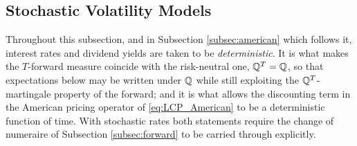 



\subsection{Stochastic Volatility Models}\label{subsec:stochvol}

Throughout this subsection, and in Subsection \ref{subsec:american} which follows it, interest rates and dividend yields are taken to be \emph{deterministic}. It is what makes the $T$-forward measure coincide with the risk-neutral one, $\mathbb{Q}^{T} = \mathbb{Q}$, so that expectations below may be written under $\mathbb{Q}$ while still exploiting the $\mathbb{Q}^{T}$-martingale property of the forward; and it is what allows the discounting term in the American pricing operator of \eqref{eq:LCP_American} to be a deterministic function of time. With stochastic rates both statements require the change of numeraire of Subsection \ref{subsec:forward} to be carried through explicitly.

